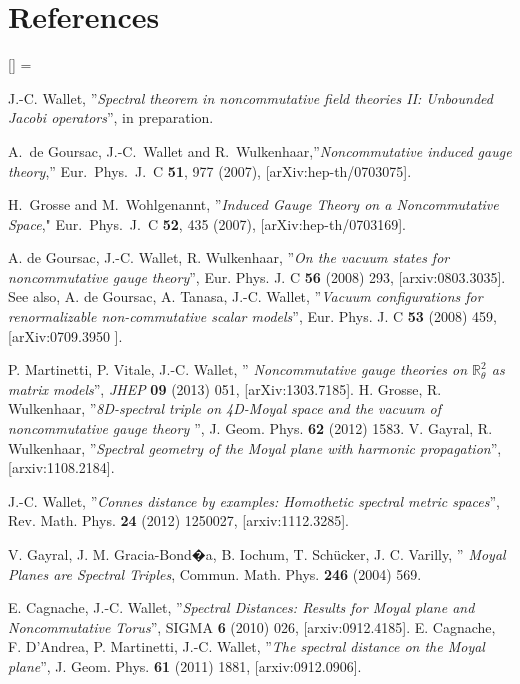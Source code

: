 \documentclass[a4paper,11pt,twoside]{article}
\numberwithin{equation}{section}
\theoremstyle{nonumberplain}
\newcounter{and}
\renewenvironment{thebibliography}[1]{%
\section*{References}%
\frenchspacing\small%
\begin{list}{[\arabic{enumi}]}%
{%
\usecounter{enumi}\parsep=2pt\topsep 0pt%
\settowidth{\labelwidth}{[#1]}%
\leftmargin=\labelwidth\advance\leftmargin\labelsep%
\rightmargin=0pt\itemsep=1pt\sloppy%
}%
}{\end{list}}
\begin{document}
\begin{thebibliography}{50}
 J.-C. Wallet, ''{\it{Spectral theorem in noncommutative field theories II: Unbounded Jacobi operators}}'', in preparation.

 A.~de Goursac, J.-C.~Wallet and R.~Wulkenhaar,''{\it{Noncommutative induced gauge theory}},''
Eur.\ Phys.\ J.\  C {\bf 51}, 977 (2007), [arXiv:hep-th/0703075].

H.~Grosse and M.~Wohlgenannt, ''{\it{Induced Gauge Theory on a Noncommutative Space}}," Eur.\ Phys.\ J.\  C {\bf 52}, 435 (2007), [arXiv:hep-th/0703169]. 

 A. de Goursac, J.-C. Wallet, R. Wulkenhaar, ''{\it{On the vacuum states for noncommutative gauge theory}}'', Eur. Phys. J. C {\bf{56}} (2008) 293, [arxiv:0803.3035]. 
See also, A. de Goursac, A. Tanasa, J.-C. Wallet, ''{\it{Vacuum configurations for renormalizable non-commutative scalar models}}'', Eur. Phys. J. C {\bf{53}} (2008) 459, [arXiv:0709.3950 ].

 P. Martinetti, P. Vitale, J.-C. Wallet, ''{\it{ Noncommutative gauge theories on $\mathbb{R}^2_\theta$ as matrix models}}'', \textit{JHEP} \textbf{09} (2013) 051, [arXiv:1303.7185].
 H. Grosse, R. Wulkenhaar, ''{\it{8D-spectral triple on 4D-Moyal space and the vacuum of noncommutative gauge theory }}'', J. Geom. Phys. {\bf{62}} (2012) 1583. V. Gayral, R. Wulkenhaar, ''{\it{Spectral geometry of the Moyal plane with harmonic propagation}}'', [arxiv:1108.2184].

 J.-C. Wallet, ''{\it{Connes distance by examples: Homothetic spectral metric spaces}}'', Rev. Math. Phys. {\bf{24}} (2012) 1250027, [arxiv:1112.3285]. 

 V. Gayral, J. M. Gracia-Bond�a, B. Iochum, T. Sch\"ucker, J. C. Varilly, ''{\it{ Moyal Planes are Spectral Triples}}, Commun. Math. Phys. {\bf{246}} (2004) 569.

 E. Cagnache, J.-C. Wallet, ''{\it{Spectral Distances: Results for Moyal plane and Noncommutative Torus}}'', SIGMA {\bf{6}} (2010) 026, [arxiv:0912.4185]. 
E. Cagnache, F. D'Andrea, P. Martinetti, J.-C. Wallet, ''{\it{The spectral distance on the Moyal plane}}'', J. Geom. Phys. {\bf{61}} (2011) 1881, [arxiv:0912.0906].


\end{thebibliography}
\end{document}
